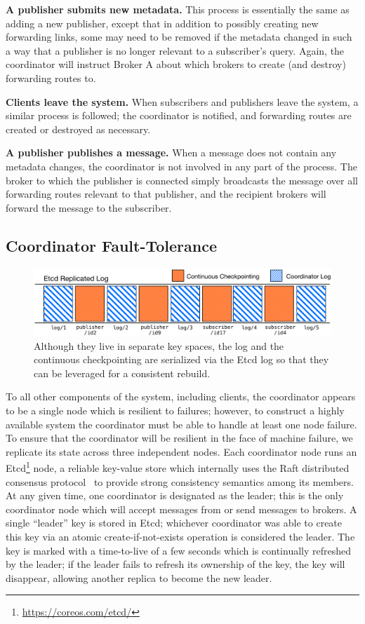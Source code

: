 \textbf{A publisher submits new metadata.}
This process is essentially the same as adding a new publisher, except that in addition to possibly creating new forwarding links, some may need to be removed if the metadata changed in such a way that a publisher is no longer relevant to a subscriber's query.
Again, the coordinator will instruct Broker A about which brokers to create (and destroy) forwarding routes to.

\textbf{Clients leave the system.}
When subscribers and publishers leave the system, a similar process is followed; the coordinator is notified, and forwarding routes are created or destroyed as necessary.

\textbf{A publisher publishes a message.}
When a message does not contain any metadata changes, the coordinator is not involved in any part of the process.
The broker to which the publisher is connected simply broadcasts the message over all forwarding routes relevant to that publisher, and the recipient brokers will forward the message to the subscriber.

\subsection{Coordinator Fault-Tolerance}
\label{subsec:coordinator_fault_tolerance}

\begin{figure}[t]
\centering
\includegraphics[width=\linewidth]{figs/logreplay.pdf}
\caption{Although they live in separate key spaces, the log and the continuous checkpointing are serialized via the Etcd log so that they can be leveraged for a consistent rebuild.}
\label{fig:logreplay}
\end{figure}

To all other components of the system, including clients, the coordinator appears to be a single node which is resilient to failures; however, to construct a highly available system the coordinator must be able to handle at least one node failure.
To ensure that the coordinator will be resilient in the face of machine failure, we replicate its state across three independent nodes.
Each coordinator node runs an Etcd\footnote{\url{https://coreos.com/etcd/}} node, a reliable key-value store which internally uses the Raft distributed consensus protocol~\cite{ongaro2014} to provide strong consistency semantics among its members.
At any given time, one coordinator is designated as the leader; this is the only coordinator node which will accept messages from or send messages to brokers.
A single ``leader'' key is stored in Etcd; whichever coordinator was able to create this key via an atomic create-if-not-exists operation is considered the leader.
The key is marked with a time-to-live of a few seconds which is continually refreshed by the leader; if the leader fails to refresh its ownership of the key, the key will disappear, allowing another replica to become the new leader.

